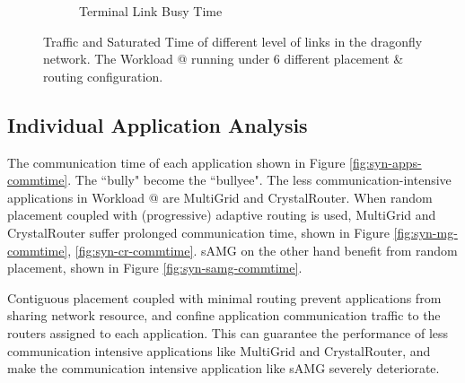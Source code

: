 \documentclass[conference,compsoc]{IEEEtran}
\makeatletter
\newcommand{\Rmnum}[1]{\expandafter\@slowromancap\romannumeral #1@}
\makeatother
\begin{document}
\begin{figure}[t]
\begin{subfigure}[t]{0.32\textwidth}
        \caption{Terminal Link Busy Time}
        \label{fig:synwkld-terminal-link-stime}
    \end{subfigure}%
   \caption{Traffic and Saturated Time of different level of links in the dragonfly network. The Workload \Rmnum{2} running under 6 different placement \& routing configuration.}
   \label{fig:synwkld-network-traffic-stime}
\end{figure}

\subsection{Individual Application Analysis}

The communication time of each application shown in Figure \ref{fig:syn-apps-commtime}. The ``bully" become the ``bullyee". The less communication-intensive applications in Workload \Rmnum{2} are  MultiGrid and CrystalRouter.  When random placement coupled with (progressive) adaptive routing is used, MultiGrid and CrystalRouter suffer prolonged communication time, shown in Figure \ref{fig:syn-mg-commtime}, \ref{fig:syn-cr-commtime}. sAMG on the other hand benefit from random placement, shown in Figure \ref{fig:syn-samg-commtime}. 

Contiguous placement coupled with minimal routing prevent applications from sharing network resource, and confine application communication traffic to the routers assigned to each application. This can guarantee the performance of less communication intensive applications like MultiGrid and CrystalRouter, and make the communication intensive application like sAMG severely deteriorate. 
\end{document}
